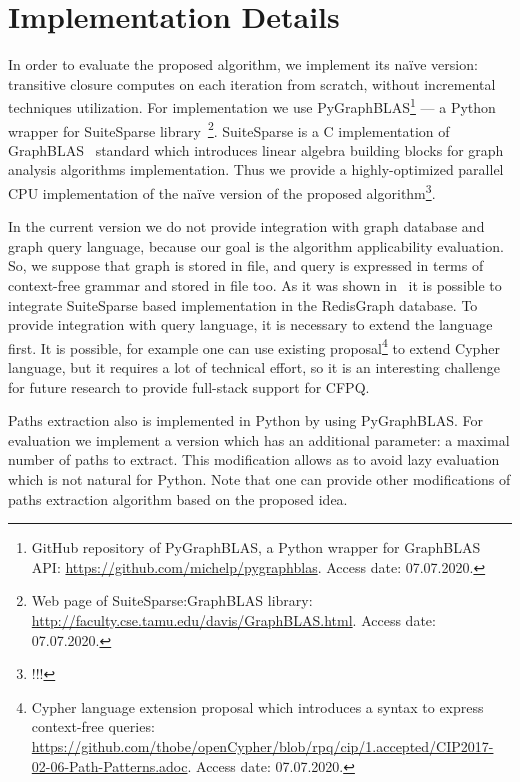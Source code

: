 \section{Implementation Details}

In order to evaluate the proposed algorithm, we implement its na{\"i}ve version: transitive closure computes on each iteration from scratch, without incremental techniques utilization. 
For implementation we use PyGraphBLAS\footnote{GitHub repository of PyGraphBLAS, a Python wrapper for GraphBLAS API: \url{https://github.com/michelp/pygraphblas}. Access date: 07.07.2020.} --- a Python wrapper for SuiteSparse library~\cite{10.1145/3322125}\footnote{Web page of SuiteSparse:GraphBLAS library: \url{http://faculty.cse.tamu.edu/davis/GraphBLAS.html}. Access date: 07.07.2020.}. 
SuiteSparse is a C implementation of GraphBLAS~\cite{7761646} standard which introduces linear algebra building blocks for graph analysis algorithms implementation.
Thus we provide a highly-optimized parallel CPU implementation of the na{\"i}ve version of the proposed algorithm\footnote{!!!}. 

In the current version we do not provide integration with graph database and graph query language, because our goal is the algorithm applicability evaluation.
So, we suppose that graph is stored in file, and query is expressed in terms of context-free grammar and stored in file too.
As it was shown in~\cite{10.1145/3398682.3399163} it is possible to integrate SuiteSparse based implementation in the RedisGraph database. 
To provide integration with query language, it is necessary to extend the language first.
It is possible, for example one can use existing proposal\footnote{Cypher language extension proposal which introduces a syntax to express context-free queries: \url{https://github.com/thobe/openCypher/blob/rpq/cip/1.accepted/CIP2017-02-06-Path-Patterns.adoc}. Access date: 07.07.2020.} to extend Cypher language, but it requires a lot of technical effort, so it is an interesting challenge for future research to provide full-stack support for CFPQ.     

Paths extraction also is implemented in Python by using PyGraphBLAS. 
For evaluation we implement a version which has an additional parameter: a maximal number of paths to extract. 
This modification allows as to avoid lazy evaluation which is not natural for Python.
Note that one can provide other modifications of paths extraction algorithm based on the proposed idea.
